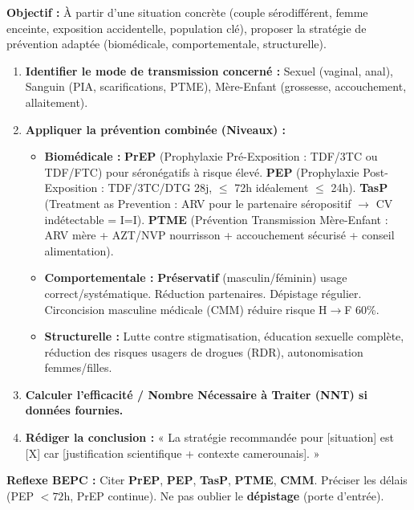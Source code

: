 \documentclass[11pt]{article}
\begin{document}
\begin{methode}
\textbf{Objectif :} À partir d'une situation concrète (couple sérodifférent, femme enceinte, exposition accidentelle, population clé), proposer la stratégie de prévention adaptée (biomédicale, comportementale, structurelle).
\begin{enumerate}
    \item \textbf{Identifier le mode de transmission concerné :} Sexuel (vaginal, anal), Sanguin (PIA, scarifications, PTME), Mère-Enfant (grossesse, accouchement, allaitement).
    \item \textbf{Appliquer la prévention combinée (Niveaux) :}
    \begin{itemize}
        \item \textbf{Biomédicale :} \textbf{PrEP} (Prophylaxie Pré-Exposition : TDF/3TC ou TDF/FTC) pour séronégatifs à risque élevé. \textbf{PEP} (Prophylaxie Post-Exposition : TDF/3TC/DTG 28j, $\le$ 72h idéalement $\le$ 24h). \textbf{TasP} (Treatment as Prevention : ARV pour le partenaire séropositif $\rightarrow$ CV indétectable = I=I). \textbf{PTME} (Prévention Transmission Mère-Enfant : ARV mère + AZT/NVP nourrisson + accouchement sécurisé + conseil alimentation).
        \item \textbf{Comportementale :} \textbf{Préservatif} (masculin/féminin) usage correct/systématique. Réduction partenaires. Dépistage régulier. Circoncision masculine médicale (CMM) réduire risque H$\rightarrow$F 60\%.
        \item \textbf{Structurelle :} Lutte contre stigmatisation, éducation sexuelle complète, réduction des risques usagers de drogues (RDR), autonomisation femmes/filles.
    \end{itemize}
    \item \textbf{Calculer l'efficacité / Nombre Nécessaire à Traiter (NNT) si données fournies.}
    \item \textbf{Rédiger la conclusion :} « La stratégie recommandée pour [situation] est [X] car [justification scientifique + contexte camerounais]. »
\end{enumerate}
\textbf{Reflexe BEPC :} Citer \textbf{PrEP}, \textbf{PEP}, \textbf{TasP}, \textbf{PTME}, \textbf{CMM}. Préciser les délais (PEP $< 72$h, PrEP continue). Ne pas oublier le \textbf{dépistage} (porte d'entrée).
\end{methode}
\end{document}
